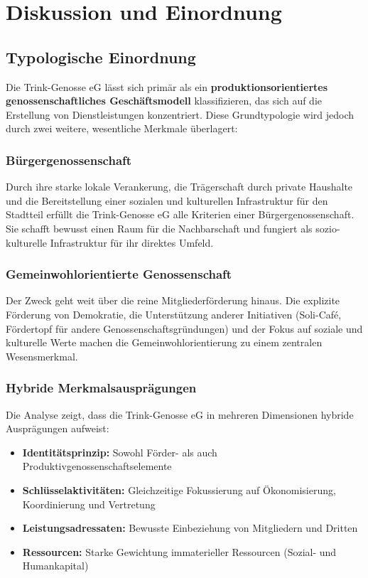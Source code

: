 \section{Diskussion und Einordnung}

\subsection{Typologische Einordnung}

Die Trink-Genosse eG lässt sich primär als ein \textbf{produktionsorientiertes genossenschaftliches Geschäftsmodell} klassifizieren, das sich auf die Erstellung von Dienstleistungen konzentriert. Diese Grundtypologie wird jedoch durch zwei weitere, wesentliche Merkmale überlagert:

\subsubsection{Bürgergenossenschaft}
Durch ihre starke lokale Verankerung, die Trägerschaft durch private Haushalte und die Bereitstellung einer sozialen und kulturellen Infrastruktur für den Stadtteil erfüllt die Trink-Genosse eG alle Kriterien einer Bürgergenossenschaft. Sie schafft bewusst einen Raum für die Nachbarschaft und fungiert als sozio-kulturelle Infrastruktur für ihr direktes Umfeld.

\subsubsection{Gemeinwohlorientierte Genossenschaft}
Der Zweck geht weit über die reine Mitgliederförderung hinaus. Die explizite Förderung von Demokratie, die Unterstützung anderer Initiativen (Soli-Café, Fördertopf für andere Genossenschaftsgründungen) und der Fokus auf soziale und kulturelle Werte machen die Gemeinwohlorientierung zu einem zentralen Wesensmerkmal.

\subsubsection{Hybride Merkmalsausprägungen}
Die Analyse zeigt, dass die Trink-Genosse eG in mehreren Dimensionen hybride Ausprägungen aufweist:

\begin{itemize}
\item \textbf{Identitätsprinzip:} Sowohl Förder- als auch Produktivgenossenschaftselemente
\item \textbf{Schlüsselaktivitäten:} Gleichzeitige Fokussierung auf Ökonomisierung, Koordinierung und Vertretung
\item \textbf{Leistungsadressaten:} Bewusste Einbeziehung von Mitgliedern und Dritten
\item \textbf{Ressourcen:} Starke Gewichtung immaterieller Ressourcen (Sozial- und Humankapital)
\end{itemize}


